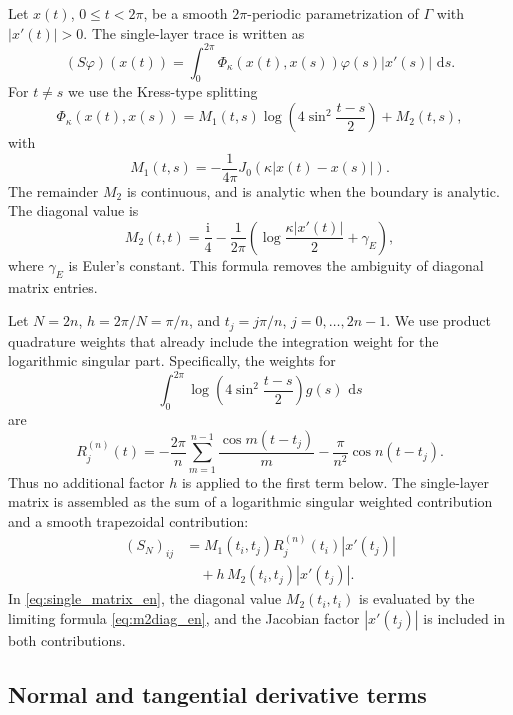 \documentclass[11pt]{article}
\numberwithin{equation}{section}
\newcommand{\ii}{\mathrm{i}}
\newcommand{\dd}{\,\mathrm{d}}
\begin{document}
Let $x(t)$, $0\le t<2\pi$, be a smooth $2\pi$-periodic parametrization of $\Gamma$ with $|x'(t)|>0$. The single-layer trace is written as
\begin{equation}
(S\varphi)(x(t))=\int_0^{2\pi}\Phi_\kappa(x(t),x(s))\varphi(s)|x'(s)|\,\dd s .
\end{equation}
For $t\ne s$ we use the Kress-type splitting
\begin{equation}
\Phi_\kappa(x(t),x(s))
=M_1(t,s)\log\left(4\sin^2\frac{t-s}{2}\right)+M_2(t,s),
\label{eq:kress_split}
\end{equation}
with
\begin{equation}
M_1(t,s)=-\frac{1}{4\pi}J_0(\kappa |x(t)-x(s)|).
\end{equation}
The remainder $M_2$ is continuous, and is analytic when the boundary is analytic. The diagonal value is
\begin{equation}
M_2(t,t)=\frac{\ii}{4}
-\frac{1}{2\pi}\left(\log\frac{\kappa |x'(t)|}{2}+\gamma_E\right),
\label{eq:m2diag_en}
\end{equation}
where $\gamma_E$ is Euler's constant. This formula removes the ambiguity of diagonal matrix entries.

Let $N=2n$, $h=2\pi/N=\pi/n$, and $t_j=j\pi/n$, $j=0,\ldots,2n-1$. We use product quadrature weights that already include the integration weight for the logarithmic singular part. Specifically, the weights for
\[
\int_0^{2\pi}\log\left(4\sin^2\frac{t-s}{2}\right)g(s)\,\dd s
\]
are
\begin{equation}
R_j^{(n)}(t)=
-\frac{2\pi}{n}\sum_{m=1}^{n-1}\frac{\cos m(t-t_j)}{m}
-\frac{\pi}{n^2}\cos n(t-t_j).
\label{eq:kress_weights_en}
\end{equation}
Thus no additional factor $h$ is applied to the first term below. The single-layer matrix is assembled as the sum of a logarithmic singular weighted contribution and a smooth trapezoidal contribution:
\begin{equation}
\begin{split}
(S_N)_{ij}
&=M_1(t_i,t_j)R_j^{(n)}(t_i)|x'(t_j)|\\
&\quad
+h\,M_2(t_i,t_j)|x'(t_j)|.
\end{split}
\label{eq:single_matrix_en}
\end{equation}
In \eqref{eq:single_matrix_en}, the diagonal value $M_2(t_i,t_i)$ is evaluated by the limiting formula \eqref{eq:m2diag_en}, and the Jacobian factor $|x'(t_j)|$ is included in both contributions.

\subsection{Normal and tangential derivative terms}
\end{document}
